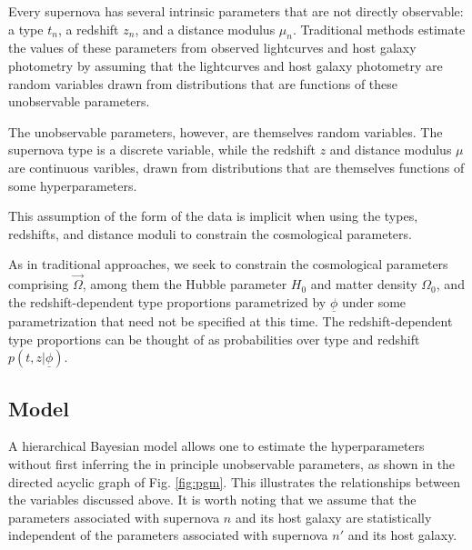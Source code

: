 \documentclass[12pt, onecolumn]{emulateapj}
\newcommand{\textul}{\underline}
\begin{document}
 Every supernova has several intrinsic parameters that are not directly observable: a type $t_{n}$, a redshift $z_{n}$, and a distance modulus $\mu_{n}$.   Traditional methods estimate the values of these parameters from observed lightcurves and host galaxy photometry by assuming that the lightcurves and host galaxy photometry are random variables drawn from distributions that are functions of these unobservable parameters.
 
The unobservable parameters, however, are themselves random variables. The supernova type is a discrete variable, while the redshift $z$ and distance modulus $\mu$ are continuous varibles, drawn from distributions that are themselves functions of some hyperparameters.  

This assumption of the form of the data is implicit when using the types, redshifts, and distance moduli to constrain the cosmological parameters.

As in traditional approaches, we seek to constrain the cosmological parameters comprising $\vec{\Omega}$, among them the Hubble parameter $H_{0}$ and matter density $\Omega_{0}$, and the redshift-dependent type proportions parametrized by $\textul{\phi}$ under some parametrization that need not be specified at this time.  The redshift-dependent type proportions can be thought of as probabilities over type and redshift $p(t, z | \textul{\phi})$.

\subsection{Model}
\label{sec:model}

A hierarchical Bayesian model allows one to estimate the hyperparameters without first inferring the in principle unobservable parameters, as shown in the directed acyclic graph of Fig. \ref{fig:pgm}. This illustrates the relationships between the variables discussed above. It is worth noting that we assume that the parameters associated with supernova $n$ and its host galaxy are statistically independent of the parameters associated with supernova $n'$ and its host galaxy.
\end{document}
